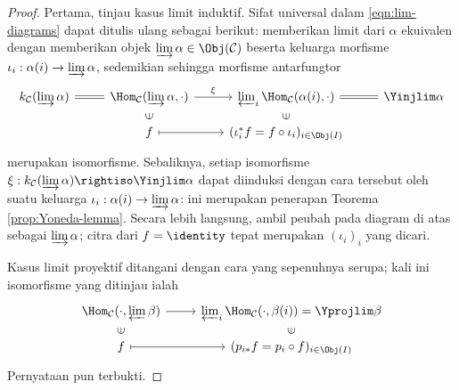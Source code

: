 \begin{proof}
	Pertama, tinjau kasus limit induktif. Sifat universal dalam \eqref{eqn:lim-diagrams} dapat ditulis ulang sebagai berikut: memberikan limit dari $\alpha$ ekuivalen dengan memberikan objek $\varinjlim \alpha \in \Obj(\mathcal{C})$ beserta keluarga morfisme $\iota_i: \alpha(i) \to \varinjlim \alpha$, sedemikian sehingga morfisme antarfungtor
	\begin{equation*}\begin{tikzcd}[row sep=small]
		k_{\mathcal{C}}(\varinjlim \alpha) \arrow[equal, r] & \Hom_{\mathcal{C}}(\varinjlim \alpha , \cdot) \arrow[r, "\xi"] & \varprojlim_i \Hom_{\mathcal{C}}(\alpha(i), \cdot) & \Yinjlim \alpha \arrow[equal, l] \\
		& f \arrow[phantom, u, sloped, "\in" description] \arrow[mapsto, r] & (\iota_i^* f = f \circ \iota_i)_{i \in \Obj(I)} \arrow[phantom, u, sloped, "\in" description] &
	\end{tikzcd}\end{equation*}
	merupakan isomorfisme. Sebaliknya, setiap isomorfisme $\xi: k_{\mathcal{C}}(\varinjlim \alpha) \rightiso \Yinjlim \alpha$ dapat diinduksi dengan cara tersebut oleh suatu keluarga $\iota_i: \alpha(i) \to \varinjlim \alpha$: ini merupakan penerapan Teorema \ref{prop:Yoneda-lemma}. Secara lebih langsung, ambil peubah pada diagram di atas sebagai $\varinjlim \alpha$; citra dari $f = \identity$ tepat merupakan $(\iota_i)_i$ yang dicari.

	Kasus limit proyektif ditangani dengan cara yang sepenuhnya serupa; kali ini isomorfisme yang ditinjau ialah
	\begin{equation*}\begin{tikzcd}[row sep=small]
		\Hom_{\mathcal{C}}(\cdot, \varprojlim \beta) \arrow[r] & \varprojlim_i \Hom_{\mathcal{C}}(\cdot, \beta(i)) = \Yprojlim \beta \\
		f \arrow[phantom, u, sloped, "\in" description] \arrow[mapsto, r] & (p_{i *} f = p_i \circ f)_{i \in \Obj(I)} \arrow[phantom, u, sloped, "\in" description]
	\end{tikzcd}\end{equation*}
	Pernyataan pun terbukti.
\end{proof}

